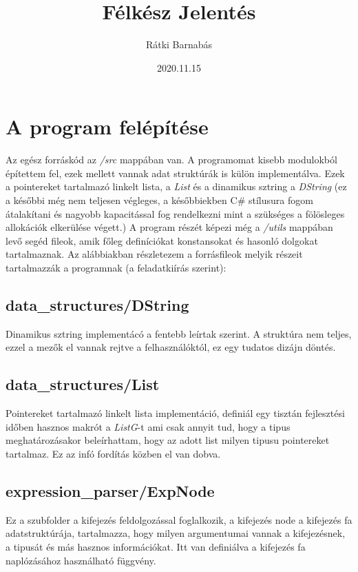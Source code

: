 \documentclass{article}[12pt,a4paper]
\title{Félkész Jelentés}
\author{Rátki Barnabás}
\date{2020.11.15}
\newcommand{\lang}[1]{\textit{#1}}
\begin{document}
    \maketitle
    
    \section{A program felépítése}
    Az egész forráskód az \lang{/src} mappában van.
    A programomat kisebb modulokból építettem fel, ezek mellett vannak adat struktúrák is külön implementálva.
    Ezek a pointereket tartalmazó linkelt lista, a \lang{List} és a dinamikus sztring a \lang{DString} (ez a későbbi még nem teljesen végleges, a későbbiekben C\# stílusura fogom átalakítani és nagyobb kapacitással fog rendelkezni mint a szükséges a fölösleges allokációk elkerülése végett.)
    A program részét képezi még a \lang{/utils} mappában levő segéd fileok, amik főleg definíciókat konstansokat és hasonló dolgokat tartalmaznak.
    Az alábbiakban részletezem a forrásfileok melyik részeit tartalmazzák a programnak (a feladatkiírás szerint):
    
    \subsection{data\_structures/DString}
    Dinamikus sztring implementácó a fentebb leírtak szerint.
    A struktúra nem teljes, ezzel a mezők el vannak rejtve a felhasználóktól, ez egy tudatos dizájn döntés.

    \subsection{data\_structures/List}
    Pointereket tartalmazó linkelt lista implementáció, definiál egy tisztán fejlesztési időben hasznos makrót a \lang{ListG}-t ami csak annyit tud, hogy a tipus meghatározásakor beleírhattam, hogy az adott list milyen tipusu pointereket tartalmaz.
    Ez az infó fordítás közben el van dobva.

    \subsection{expression\_parser/ExpNode}
    Ez a szubfolder a kifejezés feldolgozással foglalkozik, a kifejezés node a kifejezés fa adatstruktúrája, tartalmazza, hogy milyen argumentumai vannak a kifejezésnek, a tipusát és más hasznos információkat.
    Itt van definiálva a kifejezés fa naplózásához használható függvény.
\end{document}
